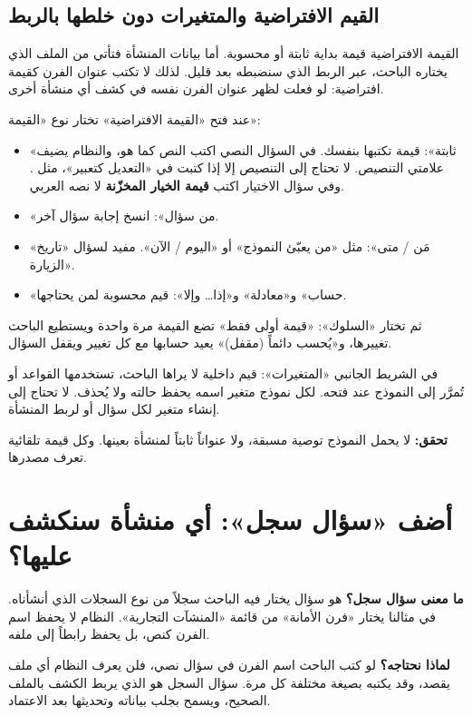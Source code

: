 \subsection{القيم الافتراضية والمتغيرات دون خلطها بالربط}

القيمة الافتراضية قيمة بداية ثابتة أو محسوبة. أما بيانات المنشأة فتأتي من الملف الذي يختاره الباحث، عبر الربط الذي سنضبطه بعد قليل. لذلك لا تكتب عنوان الفرن كقيمة افتراضية: لو فعلت لظهر عنوان الفرن نفسه في كشف أي منشأة أخرى.

عند فتح «القيمة الافتراضية» تختار نوع «القيمة»:

\begin{itemize}
\item «ثابتة»: قيمة تكتبها بنفسك. في السؤال النصي اكتب النص كما هو، والنظام يضيف علامتي التنصيص. لا تحتاج إلى التنصيص إلا إذا كتبت في «التعديل كتعبير»، مثل . وفي سؤال الاختيار اكتب \textbf{قيمة الخيار المخزّنة} لا نصه العربي.
\item «من سؤال»: انسخ إجابة سؤال آخر.
\item «مَن / متى»: مثل «من يعبّئ النموذج» أو «اليوم / الآن». مفيد لسؤال «تاريخ الزيارة».
\item «حساب» و«معادلة» و«إذا… وإلا»: قيم محسوبة لمن يحتاجها.
\end{itemize}

ثم تختار «السلوك»: «قيمة أولى فقط» تضع القيمة مرة واحدة ويستطيع الباحث تغييرها، و«يُحسب دائماً (مقفل)» يعيد حسابها مع كل تغيير ويقفل السؤال.

\begin{rcnote}[ما المتغيرات؟]
في الشريط الجانبي «المتغيرات»: قيم داخلية لا يراها الباحث، تستخدمها القواعد أو تُمرَّر إلى النموذج عند فتحه. لكل نموذج متغير اسمه  يحفظ حالته ولا يُحذف. لا تحتاج إلى إنشاء متغير لكل سؤال أو لربط المنشأة.
\end{rcnote}

\textbf{تحقق:} لا يحمل النموذج توصية مسبقة، ولا عنواناً ثابتاً لمنشأة بعينها. وكل قيمة تلقائية تعرف مصدرها.

\section{أضف «سؤال سجل»: أي منشأة سنكشف عليها؟}
\label{sec:build-record-question}

\textbf{ما معنى سؤال سجل؟} هو سؤال يختار فيه الباحث سجلاً من نوع السجلات الذي أنشأناه. في مثالنا يختار «فرن الأمانة» من قائمة «المنشآت التجارية». النظام لا يحفظ اسم الفرن كنص، بل يحفظ رابطاً إلى ملفه.

\textbf{لماذا نحتاجه؟} لو كتب الباحث اسم الفرن في سؤال نصي، فلن يعرف النظام أي ملف يقصد، وقد يكتبه بصيغة مختلفة كل مرة. سؤال السجل هو الذي يربط الكشف بالملف الصحيح، ويسمح بجلب بياناته وتحديثها بعد الاعتماد.

